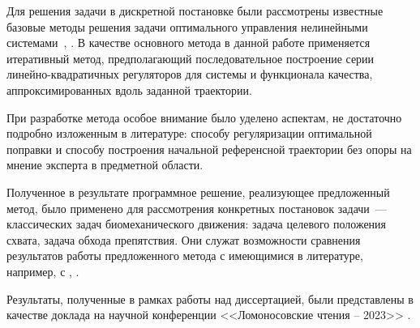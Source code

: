 \documentclass[../doc.tex]{subfiles}
\begin{document}
    Для решения задачи в дискретной постановке были рассмотрены известные базовые методы решения задачи
        оптимального управления нелинейными системами~\cite{murray1984}, \cite{li2004}.
    В качестве основного метода в данной работе применяется итеративный метод,
        предполагающий последовательное построение серии линейно-квадратичных регуляторов
        для системы и функционала качества, аппроксимированных вдоль заданной траектории.
    
    При разработке метода особое внимание было уделено аспектам, не достаточно подробно
        изложенным в литературе: способу регуляризации оптимальной поправки и способу
        построения начальной референсной траектории без опоры на мнение эксперта в предметной
        области.

    Полученное в результате программное решение, реализующее предложенный метод, 
        было применено для рассмотрения конкретных постановок задачи~---
        классических задач биомеханического движения: задача целевого положения схвата, задача обхода препятствия.
    Они служат возможности сравнения результатов работы предложенного метода с имеющимися в литературе, например, с \cite{mitrovic2010}, \cite{todorov2005}.

    Результаты, полученные в рамках работы над диссертацией, были представлены в качестве доклада на научной конференции
    <<Ломоносовские чтения -- 2023>> \cite{egorov2023}.

    \ifSubfilesClassLoaded{
        \nocite{*}
        \clearpage
        
        
    }{}
\end{document}
